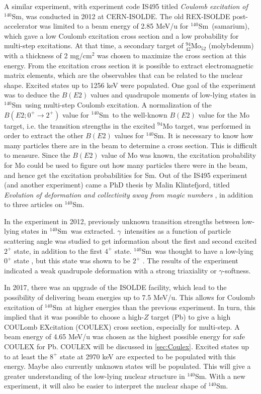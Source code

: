 \documentclass[twoside,english]{uiofysmaster/uiofysmaster}
\newcommand{\Sm}{$^{140}$Sm} %
\newcommand{\ga}{$\gamma$}
\let\orgautoref\autoref
\renewcommand{\autoref}
        {%
		 \def\sectionautorefname{Section}%
		 \def\subsectionautorefname{Section}%
		 \def\subsubsectionautorefname{Section}%
		 \def\chapterautorefname{Chapter}%
          \orgautoref}
\begin{document}
A similar experiment, with experiment code IS495 titled \textit{Coulomb excitation of} \Sm, was conducted in 2012 at CERN-ISOLDE.
The old REX-ISOLDE post-accelerator was limited to a beam energy of 2.85 MeV/u for \Sm\ (samarium), which gave a low Coulomb excitation cross section and a low probability for multi-step excitations. 
At that time, a secondary target of $^{94}_{42}$Mo$_{52}$ (molybdenum) with a thickness of 2 mg/cm$^2$ was chosen to maximize the cross section at this energy.
From the excitation cross section it is possible to extract electromagnetic matrix elements, which are the observables that can be related to the nuclear shape.
Excited states up to 1256 keV were populated.
One goal of the experiment was to deduce the $B(E2)$ values and quadrupole moments of low-lying states in \Sm\ using multi-step Coulomb excitation.
A normalization of the $B(E2; 0^+ \rightarrow 2^+)$ value for \Sm\ to the well-known $B(E2)$ value for the Mo target, i.e. the transition strengths in the excited $^{94}$Mo target, was performed in order to extract the other $B(E2)$ values for \Sm.
It is necessary to know how many particles there are in the beam to determine a cross section.
This is difficult to measure.
Since the $B(E2)$ value of Mo was known, the excitation probability for Mo could be used to figure out how many particles there were in the beam, and hence get the excitation probabilities for Sm.
Out of the IS495 experiment (and another experiment) came a PhD thesis by Malin Klintefjord, titled \textit{Evolution of deformation and collectivity away from magic numbers} \cite{Klintefjord}, in addition to three articles \cite{Klintefjord2015, Samorajczyk2015, Klintefjord2016} on \Sm.

In the experiment in 2012, previously unknown transition strengths between low-lying states in \Sm\ was extracted. 
\ga\ intensities as a function of particle scattering angle was studied to get information about the first and second excited $2^+$ state, in addition to the first $4^+$ state.
\Sm\ was thought to have a low-lying $0^+$ state \cite{Firestone}, but this state was shown to be $2^+$ \cite{Samorajczyk2015}. 
The results of the experiment indicated a weak quadrupole deformation with a strong triaxiality or \ga-softness.

In 2017, there was an upgrade of the ISOLDE facility, which lead to the possibility of delivering beam energies up to 7.5 MeV/u. 
This allows for Coulomb excitation of \Sm\ at higher energies than the previous experiment.
In turn, this implied that it was possible to choose a high-$Z$ target (Pb) to give a high COULomb EXcitation (COULEX) cross section, especially for multi-step.
A beam energy of 4.65 MeV/u was chosen as the highest possible energy for safe COULEX for Pb.
COULEX will be discussed in \autoref{sec:Coulex}.
Excited states up to at least the $8^+$ state at 2970 keV are expected to be populated with this energy.
Maybe also currently unknown states will be populated.
This will give a greater understanding of the low-lying nuclear structure in \Sm.
With a new experiment, it will also be easier to interpret the nuclear shape of \Sm.
\end{document}
